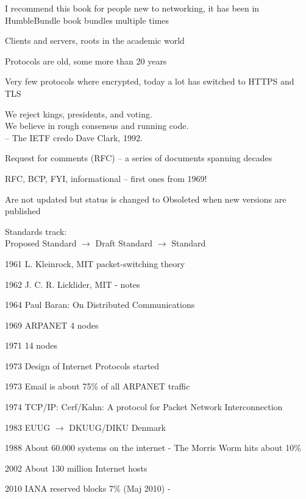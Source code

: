 \documentclass[Screen16to9,17pt]{foils}
\begin{document}
I recommend this book for people new to networking, it has been in HumbleBundle book bundles multiple times





\begin{list1}
\item Clients and servers, roots in the academic world
\item Protocols are old, some more than 20 years
\item Very few protocols where encrypted, today a lot has switched to HTTPS and TLS
\end{list1}


{\hlkbig \color{titlecolor}
We reject kings, presidents, and voting.\\
We believe in rough consensus and running code.\\
-- The IETF credo Dave Clark, 1992.}

\begin{list1}
\item Request for comments (RFC) -- a series of documents spanning decades
\item RFC, BCP, FYI, informational -- first ones from 1969!
\item Are not updated but status is changed to Obsoleted when new versions are published
\item Standards track:\\
Proposed Standard $\rightarrow$ Draft Standard $\rightarrow$ Standard
\end{list1}


\begin{list2}
\item[1961]  L. Kleinrock, MIT packet-switching theory
\item[1962]  J. C. R. Licklider, MIT - notes
\item[1964]  Paul Baran: On Distributed Communications
\item[1969]  ARPANET 4 nodes
\item[1971]  14 nodes
\item[1973]  Design of Internet Protocols started
\item[1973]  Email is about 75\% of all ARPANET traffic
\item[1974]  TCP/IP: Cerf/Kahn: A protocol for Packet
        Network Interconnection
\item[1983]  EUUG $\rightarrow$ DKUUG/DIKU Denmark
\item[1988]  About 60.000 systems on the internet -
        The Morris Worm hits about 10\%
\item[2002] About 130 million Internet hosts
\item[2010] IANA reserved blocks 7\% (Maj 2010) - 
\end{list2}
\end{document}
